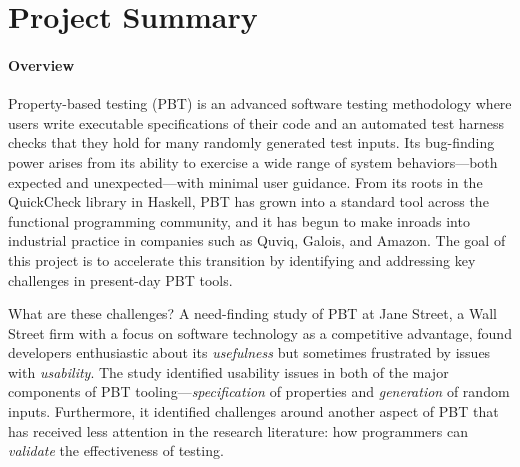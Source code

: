 \section*{Project Summary}


\paragraph*{Overview}
Property-based testing (PBT) is an advanced software testing
methodology where users write executable specifications of their code
and an automated test harness checks that they hold for many randomly
generated test inputs.  Its bug-finding power arises from its ability
to exercise a wide range of system behaviors---both expected and
unexpected---with minimal user guidance.
%
From its roots in the QuickCheck library in Haskell, PBT has grown
into a standard tool across the functional programming community, and it
has begun to make inroads into industrial practice
in companies such as Quviq, Galois, and Amazon.\iflater{}\fi{}
%
The goal of this project is to accelerate this transition
by identifying and addressing key challenges in
present-day PBT tools.

What are these challenges?
A need-finding study of PBT at Jane
Street, a Wall Street firm with a focus on software
technology as a competitive advantage, found developers enthusiastic
about its {\em usefulness} but
sometimes frustrated by issues with {\em usability}.
%
The study identified usability issues in both of the major components
of PBT tooling---{\em specification} of properties and {\em
  generation} of random inputs. Furthermore, it identified challenges
around another aspect of PBT that has received less attention in the
research literature: how programmers can {\em validate} the
effectiveness of testing.


